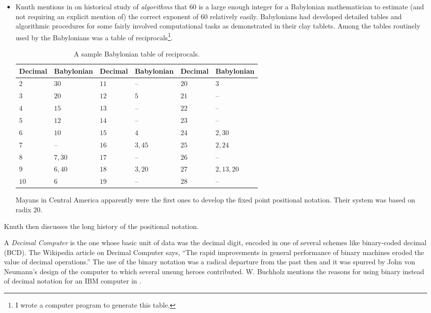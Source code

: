 \begin{itemize}
\item Knuth mentions in \cite{Knuth1972} on historical study of \textit{algorithms} that 60 is a large enough integer for a Babylonian mathematician to estimate (and not requiring an explicit mention of) the correct exponent of 60 relatively easily. Babylonians had developed detailed tables and algorithmic procedures for some fairly involved computational tasks as demonstrated in their clay tablets. Among the tables routinely used by the Babylonians was a table of reciprocals\footnote{I wrote a computer program to generate this table.}. 
\begin{table}[h!]
\caption{A sample Babylonian table of reciprocals.}
\label{tab:reciprocals}
\centering
\setlength{\tabcolsep}{8pt} %
\renewcommand{\arraystretch}{1.25} %
\begin{tabular}{@{}llllll@{}}
\toprule
Decimal
& Babylonian
& Decimal
& Babylonian
& Decimal
& Babylonian
\\
\midrule
$2$ 
& $30$ 
& $11$
& -- 
& $20$
& $3$ \\
$3$
& $20$ 
& $12$
& $5$ 
& $21$
& -- \\
$4$
& $15$ 
& $13$
& -- 
& $22$
& -- \\
$5$
& $12$ 
& $14$
& -- 
& $23$
& -- \\
$6$
& $10$ 
& $15$
& $4$ 
& $24$
& $2,30$\\
$7$
& -- 
& $16$
& $3,45$ 
& $25$
& $2,24$ \\
$8$
& $7,30$ 
& $17$
& -- 
& $26$
& -- \\
$9$
& $6,40$ 
& $18$
& $3,20$ 
& $27$
& $2, 13, 20$ \\
$10$
& $6$ 
& $19$
& -- 
& $28$
& -- \\
\bottomrule
\end{tabular}
\end{table}


Mayans in Central America apparently were the first ones to develop the fixed point positional notation. Their system was based on radix 20.
\end{itemize}

Knuth then discusses the long history of the positional notation.

A \textit{Decimal Computer} is the one whose basic unit of data was the decimal digit, encoded in one of several schemes like binary-coded decimal (BCD). The Wikipedia article \cite{DecComp} on Decimal Computer says, ``The rapid improvements in general performance of binary machines eroded the value of decimal operations.'' The use of the binary notation was a radical departure from the past then and it was spurred by John von Neumann's design of the computer to which several unsung heroes contributed. W. Buchholz mentions the reasons for using binary instead of decimal notation for an IBM computer in \cite{Buchholz1959}.

